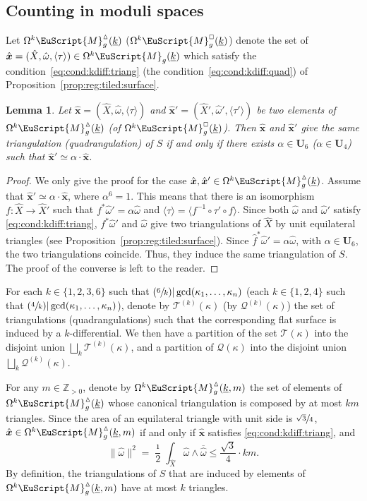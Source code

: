 \documentclass[JEP,XML,SOM,Unicode]{cedram}
\let\mathcal\EuScript
\newcommand{\Psfrac}[2]{(\sfrac{#1}{#2})}
\theoremstyle{plain}
\newtheorem{Lemma}[Theorem]{Lemma}
\theoremstyle{definition}
\newcommand\Z{\mathbb{Z}}
\newcommand{\Ub}{\mathbf{U}}
\newcommand{\Mcal}{\mathcal{M}}
\newcommand{\QQ}{\mathscr{Q}}
\newcommand{\TT}{\mathscr{T}}
\newcommand{\hX}{\hat{X}}
\newcommand{\homg}{\hat{\omega}}
\newcommand{\hf}{\hat{f}}
\newcommand{\hxx}{\hat{\boldsymbol{x}}}
\let\ol\overline
\let\ul\underline
\newcommand{\Skdiff}{\Omega^k\mathcal{M}_{g}(\ul{k})}
\newcommand{\Tkdiff}{\Omega^k\Mcal^\vartriangle_g(\ul{k})}
\newcommand{\Qkdiff}{\Omega^k\Mcal^{\scriptscriptstyle\square}_g(\ul{k})}
\newcommand{\Tkdiffm}{\Omega^k\Mcal^\vartriangle_g(\ul{k},m)}
\begin{document}
\subsection{Counting in moduli spaces}\label{sec:count:in:mod:sp}
Let $\Tkdiff$ (\resp $\Qkdiff$) denote the set of $\hxx=(\hX,\homg,\langle\tau\rangle)\in \Skdiff$ which satisfy the condition~\eqref{eq:cond:kdiff:triang} (\resp the condition~\eqref{eq:cond:kdiff:quad}) of Proposition~\ref{prop:reg:tiled:surface}.

\begin{Lemma}\label{lm:forms:same:triang}
Let $\hxx\!=\!(\hX,\homg,\langle \tau \rangle)$ and $\hxx{}'\!=\!(\hX',\homg',\langle \tau' \rangle)$ be two elements of $\Tkdiff$ (\resp of $\Qkdiff$).
Then $\hxx$ and $\hxx{}'$ give the same triangulation (\resp quadran\-gulation) of $S$ if and only if there exists $\alpha\in \Ub_6$ (\resp $\alpha\in \Ub_{4}$) such that $\hxx{}'\simeq\alpha\cdot\hxx$.
\end{Lemma}
\begin{proof}
We only give the proof for the case $\hxx,\hxx{}'\in\Tkdiff$.
Assume that $\hxx{}' \simeq\alpha\cdot\hxx$, where $\alpha^{6}=1$.
This means that there is an isomorphism $f: \hX \to \hX'$ such that $f^*\homg'=\alpha\homg$ and $\langle \tau\rangle=\langle f^{-1}\circ\tau'\circ f \rangle$. Since both $\homg$ and $\homg'$ satisfy \eqref{eq:cond:kdiff:triang}, $f^*\homg'$ and $\homg$ give two triangulations of $\hX$ by unit equilateral triangles (see Proposition~\ref{prop:reg:tiled:surface}). Since $\hf^*\homg'=\alpha\homg$, with $\alpha\in \Ub_6$, the two triangulations coincide. Thus, they induce the same triangulation of $S$. The proof of the converse is left to the reader.
\end{proof}

For each $k \in \{1,2,3,6\}$ such that $\Psfrac{6}{k} | \gcd(\kappa_1,\dots,\kappa_n)$ (\resp each $k\in \{1,2,4\}$ such that $\Psfrac{4}{k} | \gcd(\kappa_1,\dots,\kappa_n)$), denote by $\TT^{(k)}(\kappa)$ (\resp by $\QQ^{(k)}(\kappa)$) the set of triangulations (\resp quadrangulations) such that the corresponding flat surface is induced by a $k$-differential. We then have a partition of the set $\TT(\kappa)$ into the disjoint union $\bigsqcup_{k}\TT^{(k)}(\kappa)$, and a partition of $\QQ(\kappa)$ into the disjoint union $\bigsqcup_{k}\QQ^{(k)}(\kappa)$.

For any $m\in \Z_{>0}$, denote by $\Tkdiffm$ the set of elements of $\Tkdiff$ whose canonical triangulation is composed by at most $km$ triangles.
Since the area of an equilateral triangle with unit side is $\sfrac{\sqrt{3}}{4}$, $\hxx \in \Tkdiffm$ if and only if $\hxx$ satisfies \eqref{eq:cond:kdiff:triang}, and
\[
\|\homg\|^2=\frac{\imath}{2}\int_{\hX}\homg\wedge\ol{\homg} \leq \frac{\sqrt{3}}{4}\cdot km.
\]
By definition, the triangulations of $S$ that are induced by elements of $\Tkdiffm$ have at most $k$ triangles.
\end{document}
